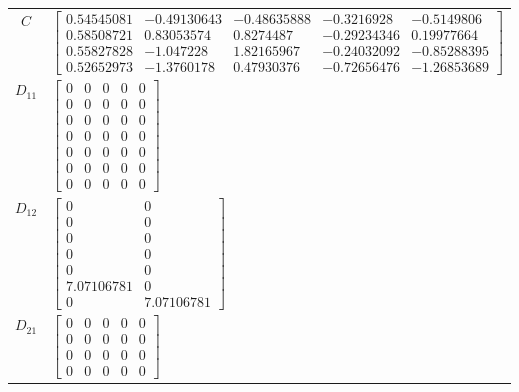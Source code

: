 \begin{tabular}{cl}
   $C$    & $\left[\begin{matrix}0.54545081 & -0.49130643 & -0.48635888 & -0.3216928 & -0.5149806\\0.58508721 & 0.83053574 & 0.8274487 & -0.29234346 & 0.19977664\\0.55827828 & -1.047228 & 1.82165967 & -0.24032092 & -0.85288395\\0.52652973 & -1.3760178 & 0.47930376 & -0.72656476 & -1.26853689\end{matrix}\right]$                                                                               \\
 $D_{11}$ & $\left[\begin{matrix}0 & 0 & 0 & 0 & 0\\0 & 0 & 0 & 0 & 0\\0 & 0 & 0 & 0 & 0\\0 & 0 & 0 & 0 & 0\\0 & 0 & 0 & 0 & 0\\0 & 0 & 0 & 0 & 0\\0 & 0 & 0 & 0 & 0\end{matrix}\right]$                                                                                                                                                                                                               \\
 $D_{12}$ & $\left[\begin{matrix}0 & 0\\0 & 0\\0 & 0\\0 & 0\\0 & 0\\7.07106781 & 0\\0 & 7.07106781\end{matrix}\right]$                                                                                                                                                                                                                                                                                 \\
 $D_{21}$ & $\left[\begin{matrix}0 & 0 & 0 & 0 & 0\\0 & 0 & 0 & 0 & 0\\0 & 0 & 0 & 0 & 0\\0 & 0 & 0 & 0 & 0\end{matrix}\right]$                                                                                                                                                                                                                                                                        \\
\hline
\end{tabular}